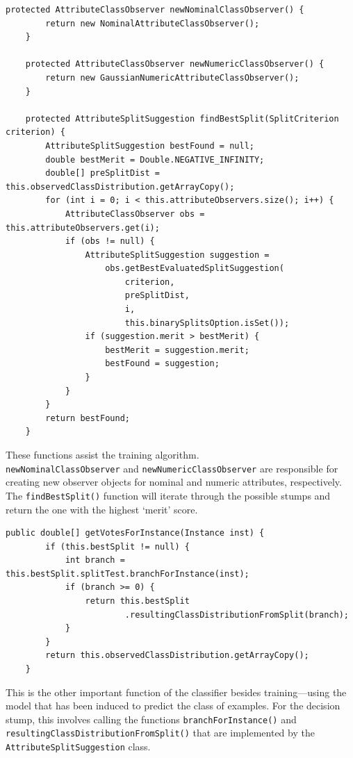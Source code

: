 \documentclass[a4paper,12pt,twoside]{book}
\begin{document}
\begin{lstlisting}[caption={Functions used during training},label=lst:trainfuncs,firstnumber=79]
	protected AttributeClassObserver newNominalClassObserver() {
		return new NominalAttributeClassObserver();
	}

	protected AttributeClassObserver newNumericClassObserver() {
		return new GaussianNumericAttributeClassObserver();
	}

	protected AttributeSplitSuggestion findBestSplit(SplitCriterion criterion) {
		AttributeSplitSuggestion bestFound = null;
		double bestMerit = Double.NEGATIVE_INFINITY;
		double[] preSplitDist = this.observedClassDistribution.getArrayCopy();
		for (int i = 0; i < this.attributeObservers.size(); i++) {
			AttributeClassObserver obs = this.attributeObservers.get(i);
			if (obs != null) {
				AttributeSplitSuggestion suggestion =
					obs.getBestEvaluatedSplitSuggestion(
						criterion,
						preSplitDist,
						i,
						this.binarySplitsOption.isSet());
				if (suggestion.merit > bestMerit) {
					bestMerit = suggestion.merit;
					bestFound = suggestion;
				}
			}
		}
		return bestFound;
	}
\end{lstlisting}

These functions assist the training algorithm. \\ \verb+newNominalClassObserver+ and \verb+newNumericClassObserver+ are responsible for creating new observer objects for nominal and numeric attributes, respectively. The \verb+findBestSplit()+ function will iterate through the possible stumps and return the one with the highest `merit' score.

\begin{lstlisting}[caption={Predicting class of unknown examples},label=lst:test,firstnumber=68]
	public double[] getVotesForInstance(Instance inst) {
		if (this.bestSplit != null) {
			int branch = this.bestSplit.splitTest.branchForInstance(inst);
			if (branch >= 0) {
				return this.bestSplit
						.resultingClassDistributionFromSplit(branch);
			}
		}
		return this.observedClassDistribution.getArrayCopy();
	}
\end{lstlisting}

This is the other important function of the classifier besides training---using the model that has been induced to predict the class of examples. For the decision stump, this involves calling the functions \verb+branchForInstance()+ and \verb+resultingClassDistributionFromSplit()+ that are implemented by the \verb+AttributeSplitSuggestion+ class.
\end{document}
